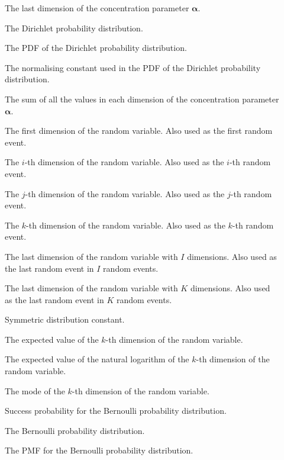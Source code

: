 \begin{description}
	\item [\parbox{2cm}{$\alpha_{K}$}] The last dimension of the concentration parameter $\boldsymbol{\alpha}$.
	\item [\parbox{2cm}{$Dir$}] The Dirichlet probability distribution.
	\item [\parbox{2cm}{$f_{Dir}$}] The \acs{PDF} of the Dirichlet probability distribution.
	\item [\parbox{2cm}{$B(\boldsymbol{\alpha})$}] The normalising constant used in the \acs{PDF} of the Dirichlet probability distribution.
	\item [\parbox{2cm}{$\alpha_{0}$}] The sum of all the values in each dimension of the concentration parameter $\boldsymbol{\alpha}$.
	\item [\parbox{2cm}{$x_{1}$}] The first dimension of the random variable. Also used as the first random event.
	\item [\parbox{2cm}{$x_{i}$}] The $i$-th dimension of the random variable. Also used as the $i$-th random event.
	\item [\parbox{2cm}{$x_{j}$}] The $j$-th dimension of the random variable. Also used as the $j$-th random event.
	\item [\parbox{2cm}{$x_{k}$}] The $k$-th dimension of the random variable. Also used as the $k$-th random event.
	\item [\parbox{2cm}{$x_{I}$}] The last dimension of the random variable with $I$ dimensions. Also used as the last random event in $I$ random events.
	\item [\parbox{2cm}{$x_{K}$}] The last dimension of the random variable with $K$ dimensions. Also used as the last random event in $K$ random events.
	\item [\parbox{2cm}{$c$}] Symmetric distribution constant.
	\item [\parbox{2cm}{$E[x_{k}]$}] The expected value of the $k$-th dimension of the random variable.
	\item [\parbox{2cm}{$E[\ln(x_{k})]$}] The expected value of the natural logarithm of the $k$-th dimension of the random variable.
	\item [\parbox{2cm}{$M[x_{k}]$}] The mode of the $k$-th dimension of the random variable.
	\item [\parbox{2cm}{$\theta$}] Success probability for the Bernoulli probability distribution.
	\item [\parbox{2cm}{$Ber$}] The Bernoulli probability distribution.
	\item [\parbox{2cm}{$f_{Ber}$}] The \acs{PMF} for the Bernoulli probability distribution.

\end{description}
